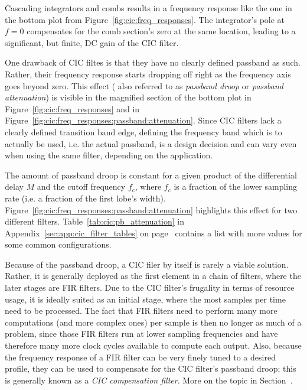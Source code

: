 Cascading integrators and  combs results in a frequency response  like the one
in the bottom  plot from Figure~\ref{fig:cic:freq_responses}. The integrator's
pole at $f = 0$ compensates for  the comb section's zero at the same location,
leading to a significant, but finite, DC gain of the CIC filter.

One  drawback of  CIC filtes  is that  they have  no clearly  defined passband
as  such. Rather,  their  frequency  response starts  dropping  off  right  as
the  frequency axis  goes  beyond  zero. This effect  (  also  referred to  as
\emph{passband  droop}  or  \emph{passband  attenuation}) is  visible  in  the
magnified section  of the  bottom plot  in Figure~\ref{fig:cic:freq_responses}
and  in   Figure~\ref{fig:cic:freq_responses:passband:attenuation}. Since  CIC
filters lack  a clearly defined  transition band edge, defining  the frequency
band which  is to  actually be  used, i.e.  the actual  passband, is  a design
decision  and can  vary even  when  using the  same filter,  depending on  the
application.

The  amount  of  passband  droop  is  constant for  a  given  product  of  the
differential  delay $M$  and  the cutoff  frequency $f_c$,  where  $f_c$ is  a
fraction  of the  lower sampling  rate (i.e.  a fraction  of the  first lobe's
width). Figure~\ref{fig:cic:freq_responses:passband:attenuation}    highlights
this  effect  for  two  different  filters. Table~\ref{tab:cic:pb_attenuation}
in                 Appendix~\ref{sec:app:cic_filter_tables}                 on
page~\pageref{tab:cic:pb_attenuation}  contains a  list with  more values  for
some common configurations.

Because  of the  passband droop,  a CIC  filer by  itself is  rarely a  viable
solution. Rather, it is generally deployed as  the first element in a chain of
filters,  where the  later stages  are FIR  filters. Due to  the CIC  filter's
frugality  in terms  of resource  usage, it  is ideally  suited as  an initial
stage, where the most samples per time need to be processed. The fact that FIR
filters need  to perform many  more computations  (and more complex  ones) per
sample is  then no longer as  much of a  problem, since those FIR  filters run
at  lower sampling  frequencies  and  have therefore  many  more clock  cycles
available  to  compute  each  output. Also,  because  the  frequency  response
of  a  FIR  filter can  be  very  finely  tuned  to a  desired  profile,  they
can  be used  to  compensate for  the  CIC filter's  passband  droop; this  is
generally  known as  a \emph{CIC  compensation filter}. More  on the  topic in
Section~\label{subsubsec:cic:compensators}.


